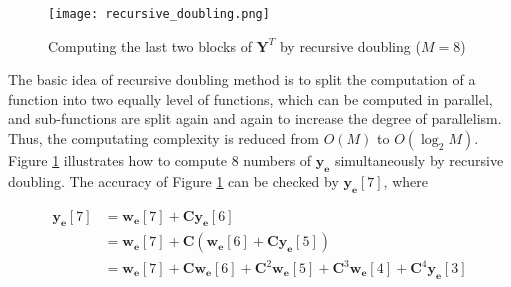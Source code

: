 \begin{figure}[t]
    \centerline{\texttt{[image: recursive\_doubling.png]}}
    \caption{Computing the last two blocks of $\bm{Y}^T$ by recursive doubling ($M=8$)}
    \label{fig:Recursive_doubling}
  \end{figure}

The basic idea of recursive doubling method is to split the computation of a function into two equally level of functions,
which can be computed in parallel, and sub-functions are split again and again to increase the degree of parallelism.
Thus, the computating complexity is reduced from $O(M)$ to $O(\log_2M)$.
Figure \ref{fig:Recursive_doubling} illustrates how to compute 8 numbers of $\bm{y_e}$ simulta\-neously
by recursive doubling.
The accuracy of Figure \ref{fig:Recursive_doubling} can be checked by
$\bm{y_e}[7]$, where

\begin{equation*}
    \begin{aligned}
        \bm{y_e}[7] &= \bm{w_e}[7] + \bm{C}\bm{y_e}[6] \\
        &= \bm{w_e}[7] + \bm{C}(\bm{w_e}[6] + \bm{C}\bm{y_e}[5]) \\
        &= \bm{w_e}[7] + \bm{C}\bm{w_e}[6] + \bm{C}^2\bm{w_e}[5] + \bm{C}^3\bm{w_e}[4] + \bm{C}^4\bm{y_e}[3]
    \end{aligned}
\end{equation*}

